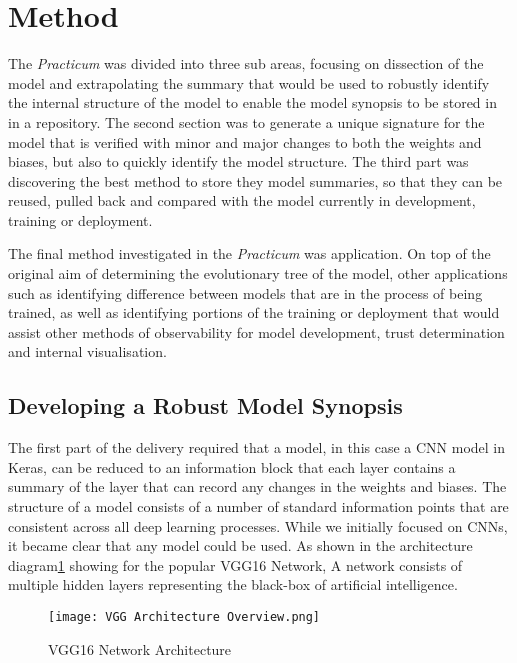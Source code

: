 \section{Method}

The \textit{Practicum} was divided into three sub areas, focusing on dissection of the model and extrapolating the summary that would be used to robustly identify the internal structure of the model to enable the model synopsis to be stored in in a repository. The second section was to generate a unique signature for the model that is verified with minor and major changes to both the weights and biases, but also to quickly identify the model structure. The third part was discovering the best method to store they model summaries, so that they can be reused, pulled back and compared with the model currently in development, training or deployment.

The final method investigated in the \textit{Practicum} was application. On top of the original aim of determining the evolutionary tree of the model, other applications such as identifying difference between models that are in the process of being trained, as well as identifying portions of the training or deployment that would assist other methods of observability for model development, trust determination and internal visualisation.

\subsection{Developing a Robust Model Synopsis}
The first part of the delivery required that a model, in this case a CNN model in Keras, can be reduced to an information block that each layer contains a summary of the layer that can record any changes in the weights and biases. The structure of a model consists of a number of standard information points that are consistent across all deep learning processes. While we initially focused on CNNs, it became clear that any model could be used. As shown in the architecture diagram\ref{fig:vgg16Architecture} showing for the popular VGG16 Network\cite{simonyanDeepConvolutionalNetworks2014}, A network consists of multiple hidden layers representing the black-box of artificial intelligence.

\begin{figure}[!ht]
    \centering
    \texttt{[image: VGG Architecture Overview.png]}
    \caption{VGG16 Network Architecture}
    \label{fig:vgg16Architecture}
\end{figure}

